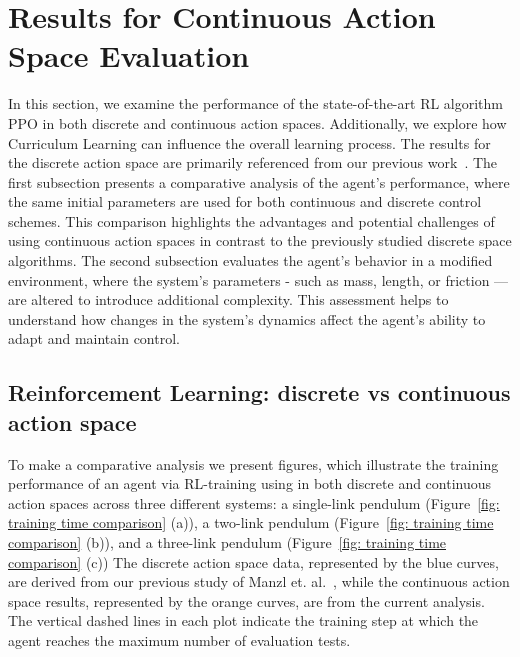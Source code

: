 \section{Results for Continuous Action Space Evaluation} \label{sec: Continuous Action Space Evaluation}
 
In this section, we examine the performance of the state-of-the-art RL algorithm PPO in both discrete and continuous action spaces. Additionally, we explore how Curriculum Learning can influence the overall learning process. The results for the discrete action space are primarily referenced from our previous work~\cite{manzl2023relrl}.
The first subsection presents a comparative analysis of the agent’s performance, where the same initial parameters are used for both continuous and discrete control schemes. This comparison highlights the advantages and potential challenges of using continuous action spaces in contrast to the previously studied discrete space algorithms.
The second subsection evaluates the agent’s behavior in a modified environment, where the system’s parameters - such as mass, length, or friction — are altered to introduce additional complexity. This assessment helps to understand how changes in the system’s dynamics affect the agent’s ability to adapt and maintain control.

\subsection{Reinforcement Learning: discrete vs continuous action space} \label{Reinforcement Learning: discrete vs continuous action space}

To make a comparative analysis we present figures, which illustrate the training performance of an agent via RL-training using in both discrete and continuous action spaces across three different systems: a single-link pendulum (Figure~\ref{fig: training time comparison} (a)), a two-link pendulum (Figure~\ref{fig: training time comparison} (b)), and a three-link pendulum (Figure~\ref{fig: training time comparison} (c)) The discrete action space data, represented by the blue curves, are derived from our previous study of Manzl et. al.~\cite{manzl2023relrl}, while the continuous action space results, represented by the orange curves, are from the current analysis. The vertical dashed lines in each plot indicate the training step at which the agent reaches the maximum number of evaluation tests.

